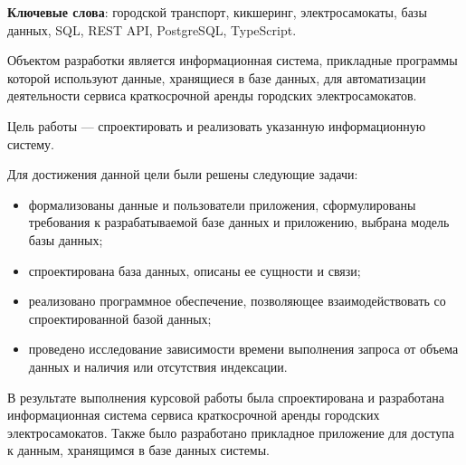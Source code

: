 \begin{essay}{}
	\noindent\textbf{Ключевые слова}: городской транспорт, кикшеринг, электросамокаты, базы данных, SQL, REST API, PostgreSQL, TypeScript.\newline\vspace{-.3cm}

	Объектом разработки является информационная система, прикладные программы которой используют данные, хранящиеся в базе данных, для автоматизации деятельности сервиса краткосрочной аренды городских электросамокатов.

	Цель работы --- спроектировать и реализовать указанную информационную систему.

	Для достижения данной цели были решены следующие задачи:

	\begin{itemize}
		\item формализованы данные и пользователи приложения, сформулированы требования к разрабатываемой базе данных и приложению, выбрана модель базы данных;
		\item спроектирована база данных, описаны ее сущности и связи;
		\item реализовано программное обеспечение, позволяющее взаимодействовать со спроектированной базой данных;
		\item проведено исследование зависимости времени выполнения запроса от объема данных и наличия или отсутствия индексации.
	\end{itemize}

	В результате выполнения курсовой работы была спроектирована и разработана информационная система сервиса краткосрочной аренды городских электросамокатов. Также было разработано прикладное приложение для доступа к данным, хранящимся в базе данных системы.
\end{essay}